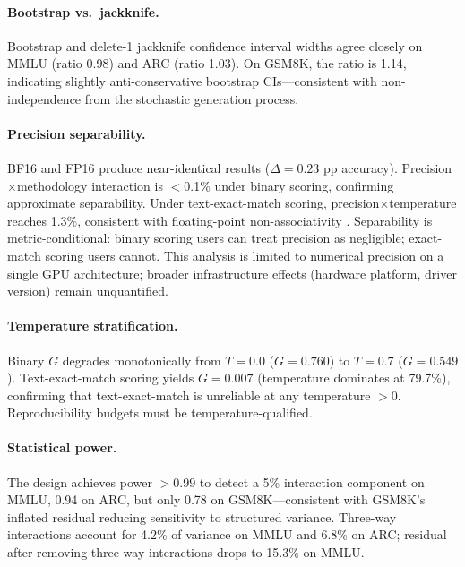 \documentclass[11pt]{article}
\begin{document}
\paragraph{Bootstrap vs.\ jackknife.}
Bootstrap and delete-1 jackknife confidence interval widths agree closely on MMLU (ratio 0.98) and ARC (ratio 1.03).
On GSM8K, the ratio is 1.14, indicating slightly anti-conservative bootstrap CIs---consistent with non-independence from the stochastic generation process.

\paragraph{Precision separability.}
BF16 and FP16 produce near-identical results ($\Delta = 0.23$ pp accuracy).
Precision$\times$methodology interaction is $<$0.1\% under binary scoring, confirming approximate separability.
Under text-exact-match scoring, precision$\times$temperature reaches 1.3\%, consistent with floating-point non-associativity \citep{messina2026}.
Separability is metric-conditional: binary scoring users can treat precision as negligible; exact-match scoring users cannot.
This analysis is limited to numerical precision on a single GPU architecture; broader infrastructure effects (hardware platform, driver version) remain unquantified.

\paragraph{Temperature stratification.}
Binary $G$ degrades monotonically from $T = 0.0$ ($G = 0.760$) to $T = 0.7$ ($G = 0.549$).
Text-exact-match scoring yields $G = 0.007$ (temperature dominates at 79.7\%), confirming that text-exact-match is unreliable at any temperature $> 0$.
Reproducibility budgets must be temperature-qualified.

\paragraph{Statistical power.}
The design achieves power $>0.99$ to detect a 5\% interaction component on MMLU, 0.94 on ARC, but only 0.78 on GSM8K---consistent with GSM8K's inflated residual reducing sensitivity to structured variance.
Three-way interactions account for 4.2\% of variance on MMLU and 6.8\% on ARC; residual after removing three-way interactions drops to 15.3\% on MMLU.

\end{document}
